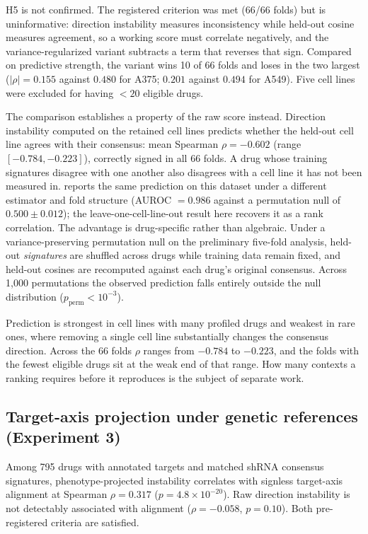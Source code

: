 \documentclass[11pt]{article}
\begin{document}
H5 is not confirmed. The registered criterion was met (66/66 folds) but
is uninformative: direction instability measures inconsistency while
held-out cosine measures agreement, so a working score must correlate
negatively, and the variance-regularized variant subtracts a term that
reverses that sign. Compared on predictive strength, the variant wins 10
of 66 folds and loses in the two largest ($|\rho| = 0.155$ against
$0.480$ for A375; $0.201$ against $0.494$ for A549). Five cell lines were
excluded for having $< 20$ eligible drugs.

The comparison establishes a property of the raw score instead. Direction
instability computed on the retained cell lines predicts whether the
held-out cell line agrees with their consensus: mean Spearman
$\rho = -0.602$ (range $[-0.784, -0.223]$), correctly signed in all 66
folds. A drug whose training signatures disagree with one another also
disagrees with a cell line it has not been measured in.
\citet{tower2026drug} reports the same prediction on this dataset under a
different estimator and fold structure (AUROC $= 0.986$ against a permutation
null of $0.500 \pm 0.012$); the leave-one-cell-line-out result here recovers it
as a rank correlation.
The advantage is drug-specific rather than algebraic. Under a
variance-preserving permutation null on the preliminary five-fold analysis,
held-out \emph{signatures} are shuffled across drugs while training data
remain fixed, and held-out cosines are recomputed against each drug's
original consensus. Across 1{,}000 permutations the observed prediction
falls entirely outside the null distribution
($p_{\text{perm}} < 10^{-3}$).

Prediction is strongest in cell lines with many profiled drugs and weakest
in rare ones, where removing a single cell line substantially changes the
consensus direction. Across the 66 folds $\rho$ ranges from $-0.784$ to
$-0.223$, and the folds with the fewest eligible drugs sit at the weak end
of that range. How many contexts a ranking requires before it reproduces is
the subject of separate work.


\subsection{Target-axis projection under genetic references (Experiment 3)}

Among 795 drugs with annotated targets and matched shRNA consensus signatures,
phenotype-projected instability correlates with signless target-axis alignment at
Spearman $\rho = 0.317$ ($p = 4.8 \times 10^{-20}$). Raw direction instability is
not detectably associated with alignment ($\rho = -0.058$, $p = 0.10$). Both
pre-registered criteria are satisfied.
\end{document}
